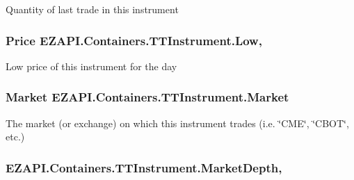 Quantity of last trade in this instrument 

\hypertarget{class_e_z_a_p_i_1_1_containers_1_1_t_t_instrument_a945159611455e9a10710b8b20235ac8d}{
\subsubsection[{Low}]{\setlength{\rightskip}{0pt plus 5cm}Price E\-Z\-A\-P\-I.\-Containers.\-T\-T\-Instrument.\-Low\hspace{0.3cm}{\ttfamily [get]}, {\ttfamily [set]}}}\label{class_e_z_a_p_i_1_1_containers_1_1_t_t_instrument_a945159611455e9a10710b8b20235ac8d}


Low price of this instrument for the day 

\hypertarget{class_e_z_a_p_i_1_1_containers_1_1_t_t_instrument_ae5e1c0d3b9311d138ddaf2c1836ea1b6}{
\subsubsection[{Market}]{\setlength{\rightskip}{0pt plus 5cm}Market E\-Z\-A\-P\-I.\-Containers.\-T\-T\-Instrument.\-Market\hspace{0.3cm}{\ttfamily [get]}}}\label{class_e_z_a_p_i_1_1_containers_1_1_t_t_instrument_ae5e1c0d3b9311d138ddaf2c1836ea1b6}


The market (or exchange) on which this instrument trades (i.\-e. \char`\"{}\-C\-M\-E\char`\"{}, \char`\"{}\-C\-B\-O\-T\char`\"{}, etc.) 

\hypertarget{class_e_z_a_p_i_1_1_containers_1_1_t_t_instrument_a9cd33fd90676e4862f67859831725459}{
\subsubsection[{Market\-Depth}]{ E\-Z\-A\-P\-I.\-Containers.\-T\-T\-Instrument.\-Market\-Depth\hspace{0.3cm}{\ttfamily [get]}, {\ttfamily [set]}}}\label{class_e_z_a_p_i_1_1_containers_1_1_t_t_instrument_a9cd33fd90676e4862f67859831725459}


